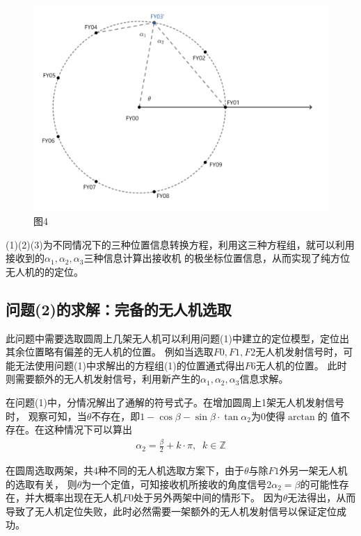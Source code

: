 \documentclass{ctexart}
\def\al{\alpha}
\def\b{\beta}
\def\t{\theta}
\begin{document}
\begin{figure}[htbp]
	\centering
	\includegraphics[scale=0.4]{pic/4.jpg}
	\caption*{图4}
\end{figure}

	(1)(2)(3)为不同情况下的三种位置信息转换方程，利用这三种方程组，就可以利用接收到的$\al_1,\al_2,\al_3$三种信息计算出接收机
	的极坐标位置信息，从而实现了纯方位无人机的的定位。

	\vspace{0.5em}
	\subsection{问题(2)的求解：完备的无人机选取}
	此问题中需要选取圆周上几架无人机可以利用问题(1)中建立的定位模型，定位出其余位置略有偏差的无人机的位置。
	例如当选取$F0,F1,F2$无人机发射信号时，可能无法使用问题(1)中求解出的方程组(1)的位置通式得出$F6$无人机的位置。
	此时则需要额外的无人机发射信号，利用新产生的$\al_1,\al_2,\al_3$信息求解。

	在问题(1)中，分情况解出了通解的符号式子。在增加圆周上1架无人机发射信号时，
	观察可知，当$\t$不存在，即$1-\cos\b -\sin\b \cdot \tan\al_2 $为0使得$\arctan$的
	值不存在。在这种情况下可以算出
	\begin{align*}
		\al_2=\frac{\b}{2}+k\cdot \pi, \;\; k\in\mathbb{Z}  
	\end{align*}

	\par
	在圆周选取两架，共4种不同的无人机选取方案下，由于$\t$与除$F1$外另一架无人机的选取有关，
	则$\t$为一个定值，可知接收机所接收的角度信号$2\al_2=\b$的可能性存在，并大概率出现在无人机$F0$处于另外两架中间的情形下。
	因为$\t$无法得出，从而导致了无人机定位失败，此时必然需要一架额外的无人机发射信号以保证定位成功。
\end{document}
